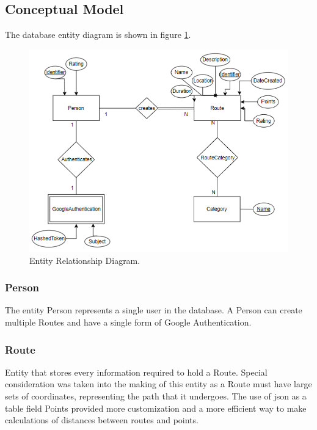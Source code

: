     \subsection*{Conceptual Model}
    The database entity diagram is shown in figure \ref{fig:erdiagram}.

    \begin{figure}[ht]            
        \includegraphics[width=\textwidth]{images/project-structure/dbms-structure.PNG}
        \caption{Entity Relationship Diagram.}
        \label{fig:erdiagram}
    \end{figure}   

        \subsubsection*{Person}
        The entity Person represents a single user in the database. A Person can create multiple Routes and have a
        single form of Google Authentication.

        \subsubsection*{Route}
        Entity that stores every information required to hold a Route. Special consideration was taken into the making
        of this entity as a Route must have large sets of coordinates, representing the path that it undergoes. The 
        use of json as a table field Points provided more customization and a more efficient way to make calculations 
        of distances between routes and points.

